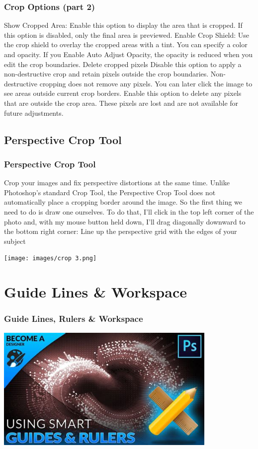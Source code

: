 \documentclass{beamer}
\begin{document}
\begin{frame}
	\frametitle{Crop Options (part 2)}
	\begin{outline}
		\1 Show Cropped Area:
		\2 Enable this option to display the area that is cropped. If this option is disabled, only the final area is previewed.
		\1 Enable Crop Shield:
		\2 Use the crop shield to overlay the cropped areas with a tint. You can specify a color and opacity. If you Enable Auto Adjust Opacity, the opacity is reduced when you edit the crop boundaries.
		\1 Delete cropped pixels
		\2 Disable this option to apply a non-destructive crop and retain pixels outside the crop boundaries. Non-destructive cropping does not remove any pixels. You can later click the image to see areas outside current crop borders.
		\2 Enable this option to delete any pixels that are outside the crop area. These pixels are lost and are not available for future adjustments.
	\end{outline}
\end{frame}

\subsection{Perspective Crop Tool}
\begin{frame}
	\frametitle{Perspective Crop Tool}
	\begin{outline}
		\1 Crop your images and fix perspective distortions at the same time.
		\1 Unlike Photoshop's standard Crop Tool, the Perspective Crop Tool does not automatically place a cropping border around the image. So the first thing we need to do is draw one ourselves. 
		\2 To do that, I'll click in the top left corner of the photo and, with my mouse button held down, I'll drag diagonally downward to the bottom right corner:
		\1 Line up the perspective grid with the edges of your subject
	\end{outline}
	\begin{center}
		\texttt{[image: images/crop 3.png]}
	\end{center}
\end{frame}
		
		
	\section{Guide Lines \& Workspace}
		\begin{frame}
		\frametitle{Guide Lines, Rulers \& Workspace}
		\begin{center}
			\includegraphics[width = 0.8\textwidth]{images/smart guides and rulers.jpg}
		\end{center}
	\end{frame}
	
\end{document}
